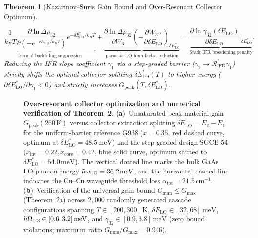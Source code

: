 \documentclass[11pt,letterpaper]{article}
\renewcommand{\hbar}{\mathchar'26\mkern-9mu h}
\newtheorem{theorem}{Theorem}
\begin{document}
\begin{theorem}[Kazarinov--Suris Gain Bound and Over-Resonant Collector Optimum]
\begin{enumerate}
    \begin{equation}
    \underbrace{\frac{1}{k_B T}\frac{\partial \ln \Delta\rho_{32}}{\partial(-e^{-\delta E_{\mathrm{LO}}/k_B T})} e^{-\delta E_{\mathrm{LO}}^*/k_B T}}_{\text{thermal backfilling suppression}} + \underbrace{\frac{\partial \ln \Delta\rho_{32}}{\partial W_3}\left(-\frac{\partial W_{31'}}{\partial \delta E_{\mathrm{LO}}}\right)_{\delta E_{\mathrm{LO}}^*}}_{\text{parasitic LO form-factor reduction}} = \underbrace{\frac{\partial \ln \gamma_{32}(\delta E_{\mathrm{LO}})}{\partial \delta E_{\mathrm{LO}}}\Bigg|_{\delta E_{\mathrm{LO}}^*}}_{\text{Stark IFR broadening penalty}}.
    \label{eq:thm2_stationary}
    \end{equation}
    Reducing the IFR slope coefficient $\gamma_1$ via a step-graded barrier ($\gamma_1 \to \mathcal{R}_{\mathrm{IFR}}^* \gamma_1$) strictly shifts the optimal collector splitting $\delta E_{\mathrm{LO}}^*(T)$ to higher energy ($\partial \delta E_{\mathrm{LO}}^*/\partial \gamma_1 < 0$) and strictly increases $G_{\mathrm{peak}}(T, \delta E_{\mathrm{LO}}^*)$.
\end{enumerate}
\end{theorem}

\begin{figure}[t!]
\centering
\resizebox{0.97\textwidth}{!}{}
\caption{\textbf{Over-resonant collector optimization and numerical verification of Theorem~2.} (\textbf{a})~Unsaturated peak material gain $G_{\mathrm{peak}}(260\,\mathrm{K})$ versus collector extraction splitting $\delta E_{\mathrm{LO}} = E_2 - E_1$ for the uniform-barrier reference G938 ($x=0.35$, red dashed curve, optimum at $\delta E_{\mathrm{LO}}^* = 48.5\,\mathrm{meV}$) and the step-graded design SGCB-54 ($x_{\mathrm{int}}=0.22, x_{\mathrm{core}}=0.42$, blue solid curve, optimum shifted to $\delta E_{\mathrm{LO}}^* = 54.0\,\mathrm{meV}$). The vertical dotted line marks the bulk $\mathrm{GaAs}$ LO-phonon energy $\hbar\omega_{\mathrm{LO}} = 36.2\,\mathrm{meV}$, and the horizontal dashed line indicates the $\mathrm{Cu}$--$\mathrm{Cu}$ waveguide threshold loss $\alpha_{\mathrm{tot}} = 21.5\,\mathrm{cm}^{-1}$. (\textbf{b})~Verification of the universal gain bound $G_{\mathrm{num}} \le G_{\max}$ (Theorem~2a) across $2{,}000$ randomly generated cascade configurations spanning $T \in [200, 300]\,\mathrm{K}$, $\delta E_{\mathrm{LO}} \in [32, 68]\,\mathrm{meV}$, $\hbar\Omega_{1'3} \in [0.6, 3.2]\,\mathrm{meV}$, and $\gamma_{32} \in [0.9, 3.8]\,\mathrm{meV}$ (zero bound violations; maximum ratio $G_{\mathrm{num}}/G_{\max} = 0.946$).}
\label{fig:over_resonant}
\end{figure}
\end{document}
